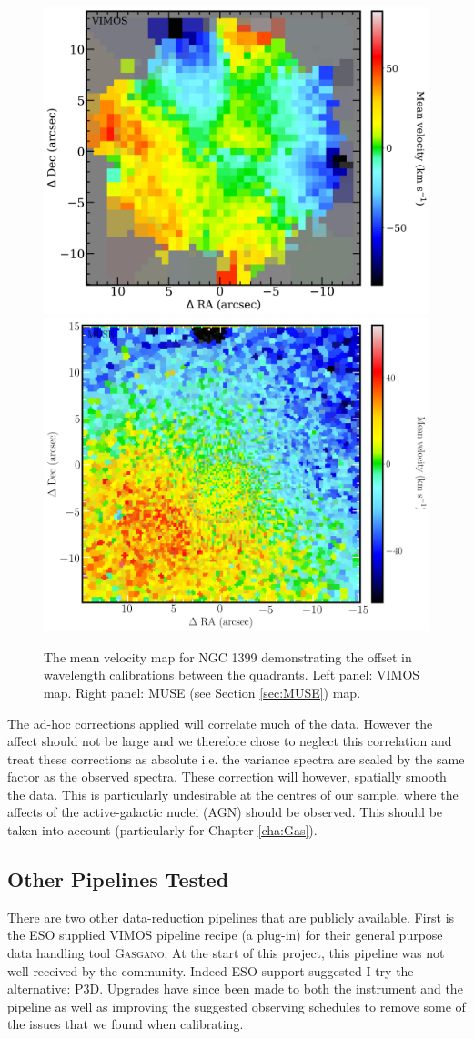 		\begin{figure}
			\centering
			\includegraphics[width=.4\textwidth]{chapter2/VIMOS_NGC1399_vel.png}
			\includegraphics[width=.4\textwidth]{chapter2/MUSE_NGC1399_vel.png}
			\caption[Issues with wavelength calibrations in VIMOS data]{The mean velocity map for NGC 1399 demonstrating the offset in wavelength calibrations between the quadrants. Left panel: VIMOS map. Right panel: MUSE (see Section \ref{sec:MUSE}) map.}
			\label{fig:egVel}
		\end{figure}

		The ad-hoc corrections applied will correlate much of the data. However the affect should not be large and we therefore chose to neglect this correlation and treat these corrections as absolute i.e. the variance spectra are scaled by the same factor as the observed spectra. These correction will however, spatially smooth the data. This is particularly undesirable at the centres of our sample, where the affects of the active-galactic nuclei (AGN) should be observed. This should be taken into account (particularly for Chapter \ref{cha:Gas}).


	\subsection{Other Pipelines Tested}
		\label{subsec:Other}
		There are two other data-reduction pipelines that are publicly available. First is the ESO supplied VIMOS pipeline recipe (a plug-in) for their general purpose data handling tool \textsc{Gasgano}. At the start of this project, this pipeline was not well received by the community. Indeed ESO support suggested I try the alternative: \textsc{P3D}. Upgrades have since been made to both the instrument and the pipeline as well as improving the suggested observing schedules to remove some of the issues that we found when calibrating. 
		
